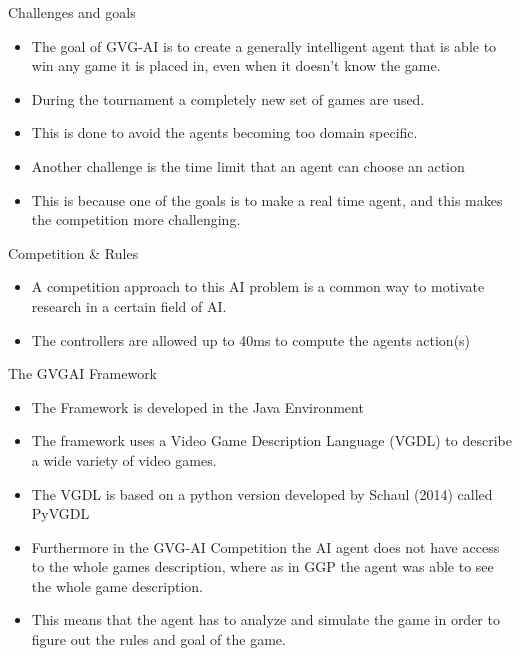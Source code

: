 \documentclass{beamer}
\begin{document}
\begin{frame}{Challenges and goals}		
			\begin{itemize}
			\item The goal of GVG-AI is to create a generally intelligent agent that is able to win any game it is placed in, even when it doesn't know the game. \pause
			\item During the tournament a completely new set of games are used. \pause
			\item This is done to avoid the agents becoming too domain specific. \pause
			\item Another challenge is the time limit that an agent can choose an action \pause
			\item This is because one of the goals is to make a real time agent, and this makes the competition more challenging. \pause
		\end{itemize}
\end{frame}
	
\begin{frame}{Competition \& Rules}		
			\begin{itemize}
			\item A competition approach to this AI problem is a common way to motivate research in a certain field of AI. \pause
			\item The controllers are allowed up to 40ms to compute the agents action(s)  \pause

		\end{itemize}
\end{frame}


\begin{frame}{The GVGAI Framework}		
			\begin{itemize}
			\item The Framework is developed in the Java Environment \pause
			\item The framework uses a Video Game Description Language (VGDL) to describe a wide variety of video games. \pause
			\item The VGDL is based on a python version developed by Schaul (2014) called PyVGDL \pause
			\item  Furthermore in the GVG-AI Competition the AI agent does not have access to the whole games description, where as in GGP the agent was able to see the whole game description. \pause
			\item  This means that the agent has to analyze and simulate the game in order to figure out the rules and goal of the game. \pause
		\end{itemize}
\end{frame}
\end{document}
